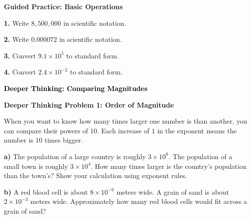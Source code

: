 \documentclass[12pt, letterpaper, fleqn]{article}
\newcommand{\blanklong}{\underline{\hspace{6.5cm}}}
\begin{document}
\begin{tcolorbox}[colback=white!15, colframe=black, boxrule=1.5pt, arc=4mm, left=6mm, right=6mm, top=5mm, bottom=5mm]

\textbf{Guided Practice: Basic Operations}

\medskip

\noindent
\textbf{1.} Write $8,500,000$ in scientific notation. \blanklong
\vspace{1.5cm}

\noindent
\textbf{2.} Write $0.000072$ in scientific notation. \blanklong
\vspace{1.5cm}

\noindent
\textbf{3.} Convert $9.1 \times 10^5$ to standard form. \blanklong
\vspace{1.5cm}

\noindent
\textbf{4.} Convert $2.4 \times 10^{-2}$ to standard form. \blanklong
\vspace{1.5cm}

\end{tcolorbox}

\newpage

\begin{tcolorbox}[colback=customteal!20]
\large\textcolor{black}{\textbf{Deeper Thinking: Comparing Magnitudes}}
\end{tcolorbox}

\vspace{3mm}

\begin{tcolorbox}[colback=white!15, colframe=black, boxrule=1.5pt, arc=4mm, left=6mm, right=6mm, top=5mm, bottom=5mm]

\textbf{Deeper Thinking Problem 1: Order of Magnitude}

\medskip

\noindent
When you want to know how many times larger one number is than another, you can compare their powers of $10$. Each increase of $1$ in the exponent means the number is $10$ times bigger.

\vspace{5mm}

\noindent
\textbf{a)} The population of a large country is roughly $3 \times 10^8$. The population of a small town is roughly $3 \times 10^4$. How many times larger is the country's population than the town's? Show your calculation using exponent rules.

\vspace{4cm}

\noindent
\textbf{b)} A red blood cell is about $8 \times 10^{-6}$ meters wide. A grain of sand is about $2 \times 10^{-3}$ meters wide. Approximately how many red blood cells would fit across a grain of sand?

\vspace{4cm}

\end{tcolorbox}
\end{document}
